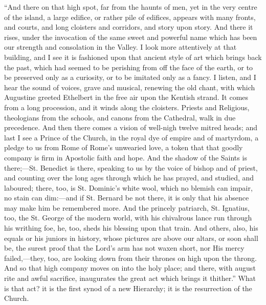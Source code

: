 ``And there on that high spot, far from the haunts
of men, yet in the very centre of the island, a large
edifice, or rather pile of edifices, appears with many
fronts, and courts, and long cloisters and corridors, and
story upon story. And there it rises, under the
invocation of the same sweet and powerful name which has
been our strength and consolation in the Valley. I look
more attentively at that building, and I see it is
fashioned upon that ancient style of art which brings
back the past, which had seemed to be perishing from off
the face of the earth, or to be preserved only as a
curiosity, or to be imitated only as a fancy. I listen,
and I hear the sound of voices, grave and musical,
renewing the old chant, with which Augustine greeted
Ethelbert in the free air upon the Kentish strand. It
comes from a long procession, and it winds along the
cloisters. Priests and Religious, theologians from the
schools, and canons from the Cathedral, walk in due
precedence. And then there comes a vision of well-nigh
twelve mitred heads; and last I see a Prince of the
Church, in the royal dye of empire and of martyrdom, a
pledge to us from Rome of Rome's unwearied love, a token
that that goodly company is firm in Apostolic faith and
hope. And the shadow of the Saints is there;—St.
Benedict is there, speaking to us by the voice of bishop
and of priest, and counting over the long ages through
which he has prayed, and studied, and laboured; there,
too, is St. Dominic's white wool, which no blemish can
impair, no stain can dim:—and if St. Bernard be not
there, it is only that his absence may make him be
remembered more. And the princely patriarch, St.
Ignatius, too, the St. George of the modern world, with
his chivalrous lance run through his writhing foe, he,
too, sheds his blessing upon that train. And others,
also, his equals or his juniors in history, whose
pictures are above our altars, or soon shall be, the
surest proof that the Lord's arm has not waxen short, nor
His mercy failed,—they, too, are looking down from
their thrones on high upon the throng. And so that high
company moves on into the holy place; and there, with
august rite and awful sacrifice, inaugurates the great
act which brings it thither.'' What is that act? it
is the first synod of a new Hierarchy; it is the
resurrection of the Church.

